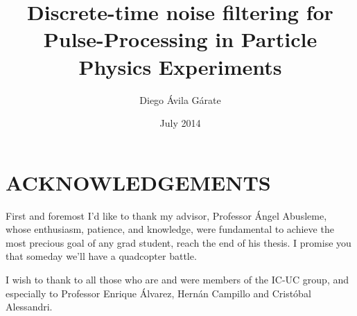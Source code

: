 \documentclass[pucformat]{XPucThesis}
\begin{document}
\version{\today}

\title[TITLE]{\textbf{Discrete-time noise filtering for Pulse-Processing in Particle Physics Experiments}}
\author[AUTOR]{Diego Ávila Gárate}
\address{Escuela de Ingenier\'ia\\
         Pontificia Universidad Cat\'olica de Chile\\ 
         Vicu\~na Mackenna 4860\\
         Santiago, Chile\\
         {\it Tel.\/} : 56 (2) 354-2000}

\advisorB{} %


\subject{Engineering}

\date{July 2014} %


\dedication{\mbox{}}

\NoChapterPageNumber    %

\maketitle

\cleardoublepage


\chapter*{ACKNOWLEDGEMENTS}

First and foremost I'd like to thank my advisor, Professor Ángel Abusleme, whose enthusiasm, patience, and knowledge, were fundamental to achieve the most precious goal of any grad student, reach the end of his thesis. I promise you that someday we'll have a quadcopter battle.

I wish to thank to all those who are and were members of the IC-UC group, and especially to Professor Enrique Álvarez, Hernán Campillo and Cristóbal Alessandri.
\end{document}
